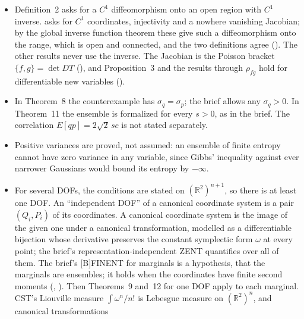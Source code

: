 \documentclass[11pt]{article}
\begin{document}
\begin{itemize}
  monotone convergence. The bounded target is reached through the standard Gaussian: the polar
  transport $T$ of $\eta$ to it, followed by $\Phi(u) = \int_0^u\varphi$ in each coordinate,
  $\varphi$ the standard Gaussian density. The coordinates take values in $[-1, 1]$ rather than
  a rectangle of side~$1$, so the bound on the variances is~$1$ rather than~$1/4$; the
  Jacobian is $\varphi(T_1)\varphi(T_2)|\det DT| = \eta$. Then $U_\rho(T) \le
  |\ln(2\pi e/h)| - E[\ln\eta]$, and a negative $U_\rho(T)$ is a violation of GCUR.
\item Definition~2 asks for a $C^1$ diffeomorphism onto an open region with $C^1$ inverse.
   asks for $C^1$ coordinates, injectivity and a nowhere vanishing Jacobian;
  by the global inverse function theorem these give such a diffeomorphism onto the range, which
  is open and connected, and the two definitions agree (). The other
  results never use the inverse. The Jacobian is the Poisson bracket $\{f, g\} = \det DT$
  (), and Proposition~3 and the results through $\rho_{fg}$ hold for
  differentiable new variables ().
\item In Theorem~8 the counterexample has $\sigma_q = \sigma_p$; the brief allows any
  $\sigma_q > 0$. In Theorem~11 the ensemble is formalized for every $s > 0$, as in the brief.
  The correlation $E[qp] = 2\sqrt2\,sc$ is not stated separately.
\item Positive variances are proved, not assumed: an ensemble of finite entropy cannot have zero
  variance in any variable, since Gibbs' inequality against ever narrower Gaussians would bound
  its entropy by $-\infty$.
\item For several DOFs, the conditions are stated on $(\mathbb R^2)^{n+1}$, so there is at least
  one DOF. An ``independent DOF'' of a canonical coordinate system is a pair $(Q_i, P_i)$ of its
  coordinates. A canonical coordinate system is the image of the given one under a canonical
  transformation, modelled as a differentiable bijection whose derivative preserves the constant
  symplectic form $\omega$ at every point; the brief's representation-independent ZENT quantifies
  over all of them. The brief's [B]FINENT for marginals is a hypothesis, that the marginals are
  ensembles; it holds when the coordinates have finite second moments
  (, ). Then
  Theorems~9 and~12 for one DOF apply to each marginal. CST's Liouville measure
  $\int\omega^n/n!$ is Lebesgue measure on $(\mathbb R^2)^n$, and canonical transformations

\end{itemize}
\end{document}
